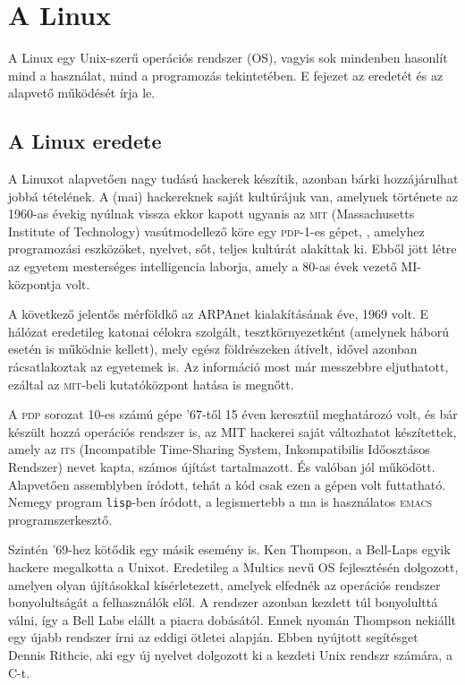 \chapter{A Linux}%
\label{cha:linux}

A Linux egy Unix-szerű operációs rendszer (OS), vagyis sok mindenben hasonlít
mind a használat, mind a programozás tekintetében. E fejezet az eredetét és az
alapvető működését írja le.


\section{A Linux eredete}

A Linuxot alapvetően nagy tudású hackerek készítik, azonban bárki hozzájárulhat
jobbá tételének. A (mai) hackereknek saját kultúrájuk van, amelynek története az
1960-as évekig nyúlnak vissza ekkor kapott ugyanis az \textsc{mit}
(Massachusetts Institute of Technology) vasútmodellező köre egy
\textsc{pdp-1}-es gépet, \cite{bazar,bazar-web}, amelyhez programozási
eszközöket, nyelvet, sőt, teljes kultúrát alakíttak ki. Ebből jött létre az
egyetem mesterséges intelligencia laborja, amely a 80-as évek vezető
MI-központja volt.

A következő jelentős mérföldkő az ARPAnet kialakításának éve, 1969 volt. E
hálózat eredetileg katonai célokra szolgált, tesztkörnyezetként (amelynek háború
esetén is működnie kellett), mely egész földrészeken átívelt, idővel azonban
rácsatlakoztak az egyetemek is. Az információ most már messzebbre eljuthatott,
ezáltal az \textsc{mit}-beli kutatóközpont hatása is megnőtt.

A \textsc{pdp} sorozat 10-es számú gépe '67-től 15 éven keresztül meghatározó
volt, és bár készült hozzá operációs rendszer is, az MIT hackerei saját
változhatot készítettek, amely az \textsc{its} (Incompatible Time-Sharing System,
Inkompatibilis Időosztásos Rendszer) nevet kapta, számos újítást
tartalmazott. És valóban jól működött. Alapvetően assemblyben íródott, tehát a
kód csak ezen a gépen volt futtatható. Nemegy program \texttt{lisp}-ben íródott,
a legismertebb a ma is használatos \textsc{emacs} programszerkesztő.


Szintén '69-hez kötődik egy másik esemény is. Ken Thompson, a Bell-Laps egyik
hackere megalkotta a Unixot. Eredetileg a Multics nevű OS fejlesztésén
dolgozott, amelyen olyan újításokkal kísérletezett, amelyek elfednék az
operációs rendszer bonyolultságát a felhasználók elől. A rendszer azonban
kezdett túl bonyolulttá válni, így a Bell Labs elállt a piacra dobásától. Ennek
nyomán Thompson nekiállt egy újabb rendszer írni az eddigi ötletei
alapján. Ebben nyújtott segítésget Dennis Rithcie, aki egy új nyelvet dolgozott
ki a kezdeti Unix rendszr számára, a C-t.


